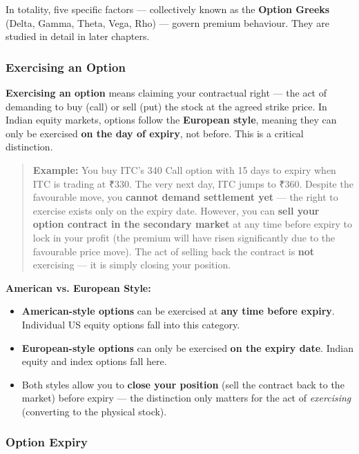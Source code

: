 \documentclass[12pt,openany]{book}
\begin{document}
In totality, five specific factors — collectively known as the \textbf{Option Greeks} (Delta, Gamma, Theta, Vega, Rho) — govern premium behaviour. They are studied in detail in later chapters.

\subsubsection{Exercising an Option}

\textbf{Exercising an option} means claiming your contractual right — the act of demanding to buy (call) or sell (put) the stock at the agreed strike price. In Indian equity markets, options follow the \textbf{European style}, meaning they can only be exercised \textbf{on the day of expiry}, not before. This is a critical distinction.

\begin{quote}
\textbf{Example:} You buy ITC's 340 Call option with 15 days to expiry when ITC is trading at ₹330. The very next day, ITC jumps to ₹360. Despite the favourable move, you \textbf{cannot demand settlement yet} — the right to exercise exists only on the expiry date. However, you can \textbf{sell your option contract in the secondary market} at any time before expiry to lock in your profit (the premium will have risen significantly due to the favourable price move). The act of selling back the contract is \textbf{not} exercising — it is simply closing your position.
\end{quote}

\textbf{American vs. European Style:}
\begin{itemize}[leftmargin=*]
    \item \textbf{American-style options} can be exercised at \textbf{any time before expiry}. Individual US equity options fall into this category.
    \item \textbf{European-style options} can only be exercised \textbf{on the expiry date}. Indian equity and index options fall here.
    \item Both styles allow you to \textbf{close your position} (sell the contract back to the market) before expiry — the distinction only matters for the act of \emph{exercising} (converting to the physical stock).
\end{itemize}

\subsubsection{Option Expiry}
\end{document}
